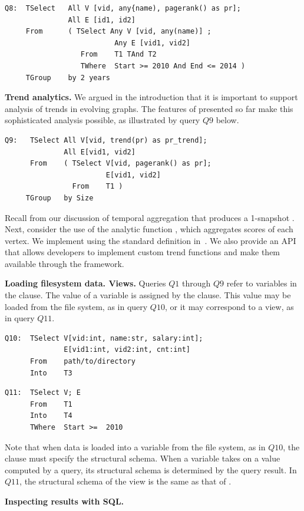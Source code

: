 \begin{verbatim}
Q8:  TSelect   All V [vid, any{name), pagerank() as pr];
               All E [id1, id2]
     From      ( TSelect Any V [vid, any(name)] ; 
                          Any E [vid1, vid2]
                  From    T1 TAnd T2
                  TWhere  Start >= 2010 And End <= 2014 )
     TGroup    by 2 years
\end{verbatim}

{\bf Trend analytics.} We argued in the introduction that it is
important to support analysis of trends in evolving graphs.  The
features of \ql presented so far make this sophisticated analysis
possible, as illustrated by query $Q9$ below.

\begin{verbatim}
Q9:   TSelect All V[vid, trend(pr) as pr_trend];
              All E[vid1, vid2]  
      From    ( TSelect V[vid, pagerank() as pr]; 
                        E[vid1, vid2]
                From    T1 )
     TGroup   by Size
\end{verbatim}

Recall from our discussion of temporal aggregation that  produces a 1-snapshot \tg.  Next, consider the use of the
analytic function , which aggregates 
scores of each vertex.  We implement  using the
standard definition in~\cite{}.  We also provide an API that allows
developers to implement custom trend functions and make them available
through the \ql framework.

{\bf Loading filesystem data.  Views.}  Queries $Q1$ through $Q9$
refer to \tg variables in the  clause.  The value of a \tg
variable is assigned by the  clause.  This value may be
loaded from the file system, as in query $Q10$, or it may correspond to
a view, as in query $Q11$.

\begin{verbatim}
Q10:  TSelect V[vid:int, name:str, salary:int]; 
              E[vid1:int, vid2:int, cnt:int]
      From    path/to/directory
      Into    T3
\end{verbatim}

\begin{verbatim}
Q11:  TSelect V; E
      From    T1
      Into    T4
      TWhere  Start >=  2010 
\end{verbatim}

Note that when data is loaded into a \tg variable from the file
system, as in $Q10$, the  clause must specify the
structural schema.  When a \tg variable takes on a value computed by a
query, its structural schema is determined by the query result.  In
$Q11$, the structural schema of the view  is the same as
that of .

{\bf Inspecting results with SQL.}  


